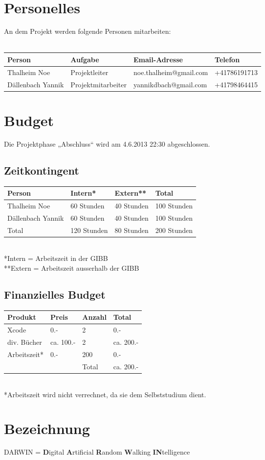 \documentclass{scrartcl}
\begin{document}
	\section{Personelles}
	An dem Projekt werden folgende Personen mitarbeiten:
	\\\\
	\begin{tabular}{| l | l | l | l |}
	\hline
	\rowcolor[gray]{0.9} Person & Aufgabe & Email-Adresse & Telefon\\
	\hline
	Thalheim Noe & Projektleiter & noe.thalheim@gmail.com & +41786191713\\
	\hline
	Dällenbach Yannik & Projektmitarbeiter  & yannikdbach@gmail.com & +41798464415\\
	\hline
	\end{tabular}
	
	\section{Budget}
	Die Projektphase „Abschluss“ wird am 4.6.2013 22:30 abgeschlossen. 
	\subsection{Zeitkontingent}
	\begin{tabularx}{\textwidth}{| X | X | X | X |}
	\hline
	\rowcolor[gray]{0.9} Person & Intern* & Extern** & Total\\
	\hline
	Thalheim Noe & 60 Stunden & 40 Stunden & 100 Stunden\\
	\hline
	Dällenbach Yannik & 60 Stunden & 40 Stunden & 100 Stunden\\
	\hline
	\rowcolor[gray]{0.9} Total & 120 Stunden & 80 Stunden & 200 Stunden\\
	\hline
	\end{tabularx}
	\\
	*Intern = Arbeitszeit in der GIBB\\
	**Extern = Arbeitszeit ausserhalb der GIBB
	\subsection{Finanzielles Budget}
	\begin{tabularx}{\textwidth}{| X | X | X | X |}
	\hline
	\rowcolor[gray]{0.9} Produkt & Preis & Anzahl & Total\\
	\hline
	Xcode & 0.- & 2 & 0.-\\
	\hline
	div. Bücher & ca. 100.- & 2 & ca. 200.-\\
	\hline
	Arbeitszeit* & 0.- & 200 & 0.-\\
	\hline
	\rowcolor[gray]{0.9} &  & Total & ca. 200.-\\
	\hline
	\end{tabularx}
	\\
	*Arbeitszeit wird nicht verrechnet, da sie dem Selbststudium dient.
	
	\section{Bezeichnung}
	DARWIN = \textbf{D}igital \textbf{A}rtificial \textbf{R}andom \textbf{W}alking \textbf{IN}telligence
	
	\printglossaries
	
\end{document}
